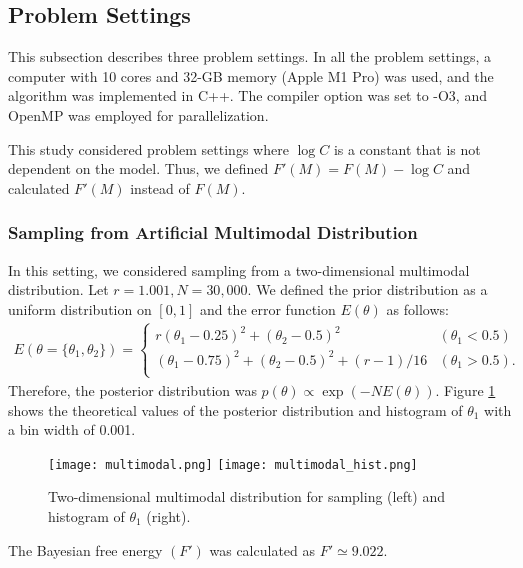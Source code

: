 \documentclass[12pt]{article}
\begin{document}
\subsection{Problem Settings}
This subsection describes three problem settings.
In all the problem settings, a computer with 10 cores and 32-GB memory (Apple M1 Pro) was used, and the algorithm was implemented in C++.
The compiler option was set to -O3, and OpenMP was employed for parallelization. \par
This study considered problem settings where $\log C$ is a constant that is not dependent on the model.
Thus, we defined $F'(M) = F(M) - \log C$ and calculated $F'(M)$ instead of $F(M)$.
\subsubsection{Sampling from Artificial Multimodal Distribution}
In this setting, we considered sampling from a two-dimensional multimodal distribution. Let $r = 1.001, N = 30{,}000$.
We defined the prior distribution as a uniform distribution on $[0,1]$ and the error function $E(\theta)$ as follows:
\begin{align}
  E(\theta = \{\theta_1, \theta_2\} ) = \begin{cases}
      r(\theta_1 - 0.25)^2 + (\theta_2 - 0.5)^2 & (\theta_1 < 0.5) \\
      (\theta_1 - 0.75)^2 + (\theta_2 - 0.5)^2 + (r-1)/16 & (\theta_1 > 0.5). \\ 
  \end{cases}           
\end{align}
Therefore, the posterior distribution was $p(\theta) \propto \exp(-NE(\theta))$.
Figure \ref{fig:multimodal} shows the theoretical values of the posterior distribution and histogram of $\theta_1$ with a bin width of 0.001. 
\begin{figure}[H]
  \centering
  \texttt{[image: multimodal.png]}
  \texttt{[image: multimodal\_hist.png]}
  \caption{Two-dimensional multimodal distribution for sampling (left) and histogram of $\theta_1$ (right).}
  \label{fig:multimodal}
\end{figure}
The Bayesian free energy $(F')$ was calculated as $F' \simeq 9.022$. \par

\end{document}
